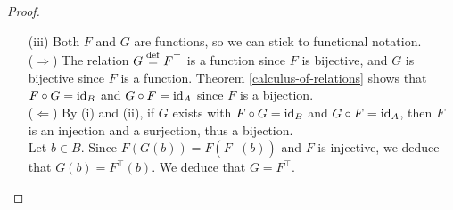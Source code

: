 \begin{proof}
\begin{itemize}
		\item[(iii)] Both $F$ and $G$ are functions, so we can stick to functional notation.
		\\
		($\Rightarrow$) The relation $G \overset{\mathrm{def}}{=} F^{\top}$ is a function since $F$ is bijective, and $G$ is bijective since $F$ is a function. Theorem \autoref{calculus-of-relations} shows that $F \circ G = \operatorname{\mathrm{id}}_{B}$ and $G \circ F = \operatorname{\mathrm{id}}_{A}$ since $F$ is a bijection.
		\\

		($\Leftarrow$) By (i) and (ii), if $G$ exists with $F \circ G = \operatorname{\mathrm{id}}_{B}$ and $G \circ F = \operatorname{\mathrm{id}}_{A}$, then $F$ is an injection and a surjection, thus a bijection.
		\\

		Let $b \in B$. Since $F(G(b)) = F(F^{\top}(b))$ and $F$ is injective, we deduce that $G(b) = F^{\top}(b)$. We deduce that $G = F^{\top}$.
	\end{itemize}
\end{proof}